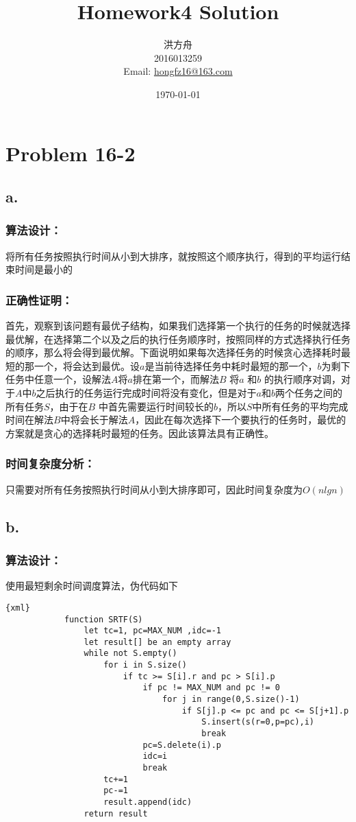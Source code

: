 \documentclass{article}
\title{Homework4 Solution}
\author{洪方舟\\2016013259\\Email: \href{mailto:hongfz16@163.com}{hongfz16@163.com}}
\date{\today}
\begin{document}
  \maketitle
  \setlength\parindent{0em}
  \section*{Problem 16-2}
    \subsection*{a.}
        \subsubsection*{算法设计：}
            将所有任务按照执行时间从小到大排序，就按照这个顺序执行，得到的平均运行结束时间是最小的
        \subsubsection*{正确性证明：}
            首先，观察到该问题有最优子结构，如果我们选择第一个执行的任务的时候就选择最优解，在选择第二个以及之后的执行任务顺序时，按照同样的方式选择执行任务的顺序，那么将会得到最优解。下面说明如果每次选择任务的时候贪心选择耗时最短的那一个，将会达到最优。设$a$是当前待选择任务中耗时最短的那一个，$b$为剩下任务中任意一个，设解法$A$将$a$排在第一个，而解法$B$ 将$a$ 和$b$ 的执行顺序对调，对于$A$中$b$之后执行的任务运行完成时间将没有变化，但是对于$a$和$b$两个任务之间的所有任务$S$，由于在$B$ 中首先需要运行时间较长的$b$，所以$S$中所有任务的平均完成时间在解法$B$中将会长于解法$A$，因此在每次选择下一个要执行的任务时，最优的方案就是贪心的选择耗时最短的任务。因此该算法具有正确性。
        \subsubsection*{时间复杂度分析：}
            只需要对所有任务按照执行时间从小到大排序即可，因此时间复杂度为$O(nlgn)$
    \subsection*{b.}
        \subsubsection*{算法设计：}
            使用最短剩余时间调度算法，伪代码如下
            \begin{lstlisting}{xml}
            function SRTF(S)
                let tc=1, pc=MAX_NUM ,idc=-1
                let result[] be an empty array
                while not S.empty()
                    for i in S.size()
                        if tc >= S[i].r and pc > S[i].p
                            if pc != MAX_NUM and pc != 0
                                for j in range(0,S.size()-1)
                                    if S[j].p <= pc and pc <= S[j+1].p
                                        S.insert(s(r=0,p=pc),i)
                                        break
                            pc=S.delete(i).p
                            idc=i
                            break
                    tc+=1
                    pc-=1
                    result.append(idc)
                return result
            \end{lstlisting}
\end{document}
